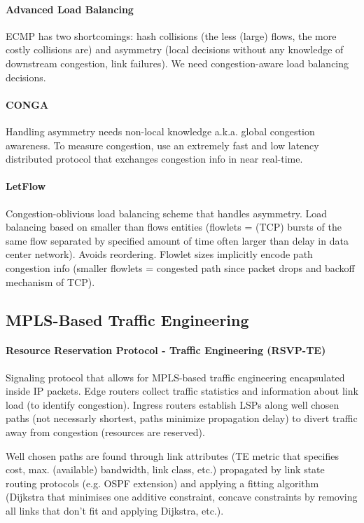 \paragraph{Advanced Load Balancing}
ECMP has two shortcomings: hash collisions (the less (large) flows, the more costly collisions are) and asymmetry (local decisions without any knowledge of downstream congestion, link failures). We need congestion-aware load balancing decisions.


\paragraph{CONGA}
Handling asymmetry needs non-local knowledge a.k.a. global congestion awareness. To measure congestion, use an extremely fast and low latency distributed protocol that exchanges congestion info in near real-time.

\paragraph{LetFlow}
Congestion-oblivious load balancing scheme that handles asymmetry. Load balancing based on smaller than flows entities (flowlets = (TCP) bursts of the same flow separated by specified amount of time often larger than delay in data center network). Avoids reordering. Flowlet sizes implicitly encode path congestion info (smaller flowlets = congested path since packet drops and backoff mechanism of TCP).

\subsection{MPLS-Based Traffic Engineering}

\paragraph{Resource Reservation Protocol - Traffic Engineering (RSVP-TE)}
Signaling protocol that allows for MPLS-based traffic engineering encapsulated inside IP packets. Edge routers collect traffic statistics and information about link load (to identify congestion). Ingress routers establish LSPs along well chosen paths (not necessarly shortest, paths minimize propagation delay) to divert traffic away from congestion (resources are reserved).

Well chosen paths are found through link attributes (TE metric that specifies cost, max. (available) bandwidth, link class, etc.) propagated by link state routing protocols (e.g. OSPF extension) and applying a fitting algorithm (Dijkstra that minimises one additive constraint, concave constraints by removing all links that don't fit and applying Dijkstra, etc.).

